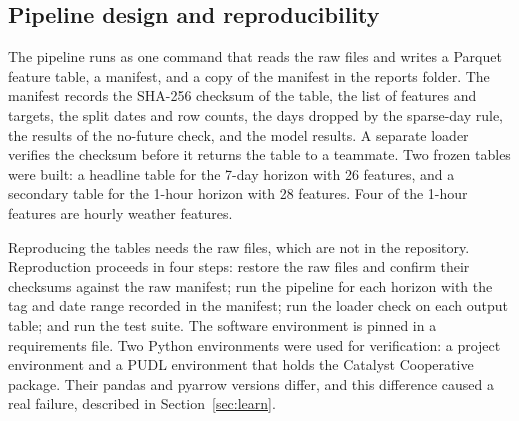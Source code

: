 \documentclass[10pt,journal,compsoc]{IEEEtran}
\begin{document}
\subsection{Pipeline design and reproducibility}
The pipeline runs as one command that reads the raw files and writes a Parquet feature table, a manifest, and a copy of the manifest in the reports folder. The manifest records the SHA-256 checksum of the table, the list of features and targets, the split dates and row counts, the days dropped by the sparse-day rule, the results of the no-future check, and the model results. A separate loader verifies the checksum before it returns the table to a teammate. Two frozen tables were built: a headline table for the 7-day horizon with 26 features, and a secondary table for the 1-hour horizon with 28 features. Four of the 1-hour features are hourly weather features.

Reproducing the tables needs the raw files, which are not in the repository. Reproduction proceeds in four steps: restore the raw files and confirm their checksums against the raw manifest; run the pipeline for each horizon with the tag and date range recorded in the manifest; run the loader check on each output table; and run the test suite. The software environment is pinned in a requirements file. Two Python environments were used for verification: a project environment and a PUDL environment that holds the Catalyst Cooperative package. Their pandas and pyarrow versions differ, and this difference caused a real failure, described in Section~\ref{sec:learn}.
\end{document}
